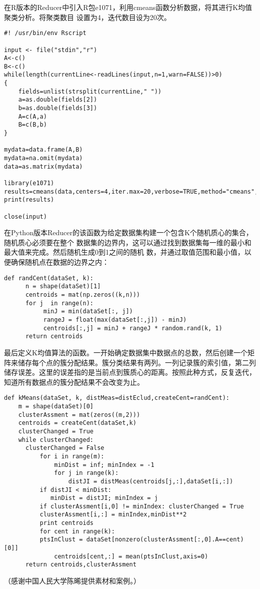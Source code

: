 在R版本的Reducer中引入R包e1071，利用cmeans函数分析数据，将其进行K均值聚类分析。将聚类数目
设置为4，迭代数目设为20次。

\begin{lstlisting}
#! /usr/bin/env Rscript

input <- file("stdin","r")
A<-c()
B<-c()
while(length(currentLine<-readLines(input,n=1,warn=FALSE))>0)
{
    fields=unlist(strsplit(currentLine," "))
    a=as.double(fields[2])
    b=as.double(fields[3])
    A=c(A,a)
    B=c(B,b)
}

mydata=data.frame(A,B)
mydata=na.omit(mydata)
data=as.matrix(mydata)

library(e1071)
results=cmeans(data,centers=4,iter.max=20,verbose=TRUE,method="cmeans",m=2)
print(results)

close(input)
\end{lstlisting}

在Python版本Reducer的该函数为给定数据集构建一个包含K个随机质心的集合，随机质心必须要在整个
数据集的边界内，这可以通过找到数据集每一维的最小和最大值来完成。然后随机生成0到1之间的随机
数，并通过取值范围和最小值，以便确保随机点在数据的边界之内：

\begin{lstlisting}
def randCent(dataSet, k):
      n = shape(dataSet)[1]
      centroids = mat(np.zeros((k,n)))
      for j  in range(n):
           minJ = min(dataSet[:, j])
           rangeJ = float(max(dataSet[:,j]) - minJ)
           centroids[:,j] = minJ + rangeJ * random.rand(k, 1)
      return centroids
\end{lstlisting}

最后定义K均值算法的函数。一开始确定数据集中数据点的总数，然后创建一个矩阵来储存每个点的簇分配结果。簇分类结果有两列。一列记录簇的索引值，第二列储存误差。这里的误差指的是当前点到簇质心的距离。按照此种方式，反复迭代，知道所有数据点的簇分配结果不会改变为止。

\begin{lstlisting}
def kMeans(dataSet, k, distMeas=distEclud,createCent=randCent):
    m = shape(dataSet)[0]
    clusterAssment = mat(zeros((m,2)))
    centroids = createCent(dataSet,k)
    clusterChanged = True
    while clusterChanged:
      clusterChanged = False
          for i in range(m):
              minDist = inf; minIndex = -1
              for j in range(k):
                  distJI = distMeas(centroids[j,:],dataSet[i,:])
          if distJI < minDist:
             minDist = distJI; minIndex = j
          if clusterAssment[i,0] != minIndex: clusterChanged = True
          clusterAssment[i,:] = minIndex,minDist**2
          print centroids
          for cent in range(k):
          ptsInClust = dataSet[nonzero(clusterAssment[:,0].A==cent)[0]]
              centroids[cent,:] = mean(ptsInClust,axis=0)
      return centroids,clusterAssment
\end{lstlisting}

（感谢中国人民大学陈晞提供素材和案例。）
